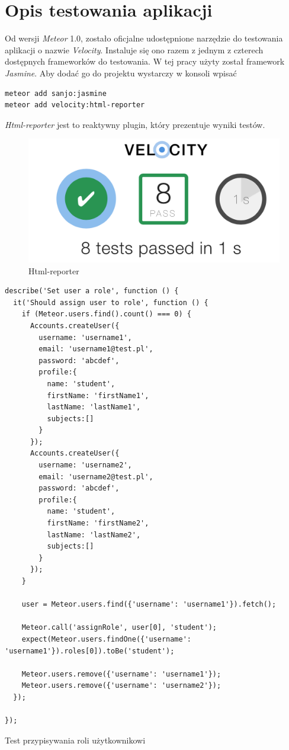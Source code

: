 \documentclass{xmgr}
\begin{document}
\cite{Introduction}
\cite{MeteorDocs}
\cite{MongoDocs}
\cite{ScalingMongoDB2011}
\cite{ScalingWithMongoDB}
\section{Opis testowania aplikacji}
Od wersji \textit{Meteor} 1.0, zostało oficjalne udostępnione narzędzie do testowania aplikacji o nazwie \textit{Velocity}. Instaluje się ono razem z jednym z czterech dostępnych frameworków do testowania. W tej pracy użyty został framework \textit{Jasmine}. Aby dodać go do projektu wystarczy w konsoli wpisać

\begin{lstlisting}[language=bash,caption={Instalacja Velocity, Jasmine i html reporter}]
meteor add sanjo:jasmine
meteor add velocity:html-reporter
\end{lstlisting}

\textit{Html-reporter} jest to reaktywny plugin, który prezentuje wyniki testów.

\begin{figure}[H]
\centering
\includegraphics[width=0.7\hsize]{images/htmlReporter} 
\caption{Html-reporter\label{RYS.18}}
\end{figure}

\begin{listing}[H]
\begin{verbatim}
describe('Set user a role', function () {
  it('Should assign user to role', function () {
    if (Meteor.users.find().count() === 0) {
      Accounts.createUser({
        username: 'username1',
        email: 'username1@test.pl',
        password: 'abcdef',
        profile:{
          name: 'student',
          firstName: 'firstName1',
          lastName: 'lastName1',
          subjects:[]
        }
      });
      Accounts.createUser({
        username: 'username2',
        email: 'username2@test.pl',
        password: 'abcdef',
        profile:{
          name: 'student',
          firstName: 'firstName2',
          lastName: 'lastName2',
          subjects:[]
        }
      });
    }

    user = Meteor.users.find({'username': 'username1'}).fetch();

    Meteor.call('assignRole', user[0], 'student');
    expect(Meteor.users.findOne({'username': 'username1'}).roles[0]).toBe('student');

    Meteor.users.remove({'username': 'username1'});
    Meteor.users.remove({'username': 'username2'});
  });

});
\end{verbatim}
\caption{Test przypisywania roli użytkownikowi}
\end{listing}
\end{document}
